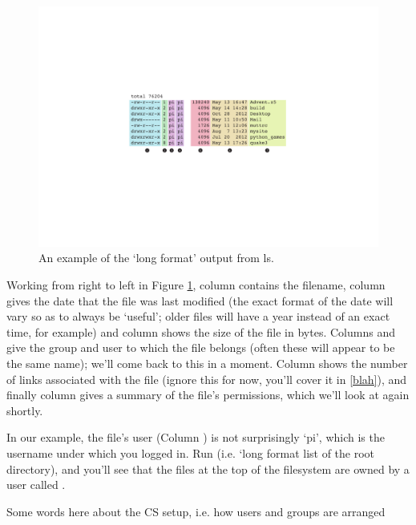 \begin{figure}
\centerline{\includegraphics[width=14cm]{images/longformls}}
\caption{An example of the `long format' output from ls.}\label{figure:longformls}
\end{figure}

Working from right to left in Figure \ref{figure:longformls}, column \protect{} contains the filename, column \protect{} gives the date that the file was last modified (the exact format of the date will vary so as to always be `useful'; older files will have a year instead of an exact time, for example) and column \protect{} shows the size of the file in bytes. Columns \protect{} and \protect{} give the group and user to which the file belongs (often these will appear to be the same name); we'll come back to this in a moment. Column \protect{} shows the number of links associated with the file (ignore this for now, you'll cover it in \ref{blah}), and finally column \protect{} gives a summary of the file's permissions, which we'll look at again shortly. 

In our example, the file's user (Column \protect{}) is not surprisingly `pi', which is the username under which you logged in. Run  (i.e. `long format list of the root directory), and you'll see that the files at the top of the filesystem are owned by a user called . 

\begin{note}
Some words here about the CS setup, i.e. how users and groups are arranged
\end{note}

